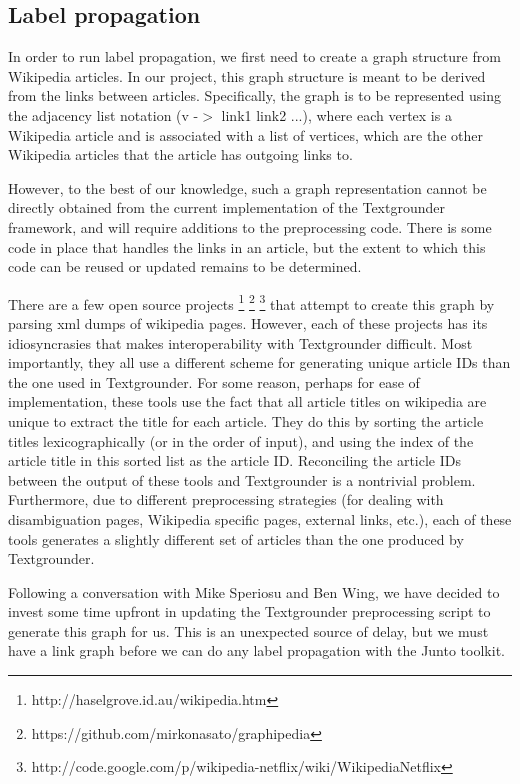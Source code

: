 \subsection{Label propagation} 

In order to run label propagation, we first need to create a graph structure
from Wikipedia articles. In our project, this graph structure is meant to be
derived from the links between articles. Specifically, the graph is to be
represented using the adjacency list notation (v -$>$ link1 link2 ...), where
each vertex is a Wikipedia article and is associated with a list of vertices,
which are the other Wikipedia articles that the article has outgoing links to.

\par However, to the best of our knowledge, such a graph
representation cannot be directly obtained from the current implementation of
the Textgrounder framework, and will require additions to the preprocessing
code. There is some code in place that handles the links in an article, but the
extent to which this code can be reused or updated remains to be determined.

There are a few open source projects
\footnote{http://haselgrove.id.au/wikipedia.htm}
\footnote{https://github.com/mirkonasato/graphipedia}
\footnote{http://code.google.com/p/wikipedia-netflix/wiki/WikipediaNetflix} that
attempt to create this graph by parsing xml dumps of wikipedia pages. However,
each of these projects has its idiosyncrasies that makes interoperability with
Textgrounder difficult.  Most importantly, they all use a different scheme for
generating unique article IDs than the one used in Textgrounder. For some
reason, perhaps for ease of implementation, these tools use the fact that all
article titles on wikipedia are unique to extract the title for each article.
They do this by sorting the article titles lexicographically (or in the order of
input), and using the index of the article title in this sorted list as the
article ID. Reconciling the article IDs between the output of these tools and
Textgrounder is a nontrivial problem. Furthermore, due to different
preprocessing strategies (for dealing with disambiguation pages, Wikipedia
specific pages, external links, etc.), each of these tools generates a slightly
different set of articles than the one produced by Textgrounder. 

\par Following a conversation with Mike Speriosu and Ben Wing, we have decided
to invest some time upfront in updating the Textgrounder preprocessing script
to generate this graph for us. This is an unexpected source of delay, but we
must have a link graph before we can do any label propagation with the Junto
toolkit.

